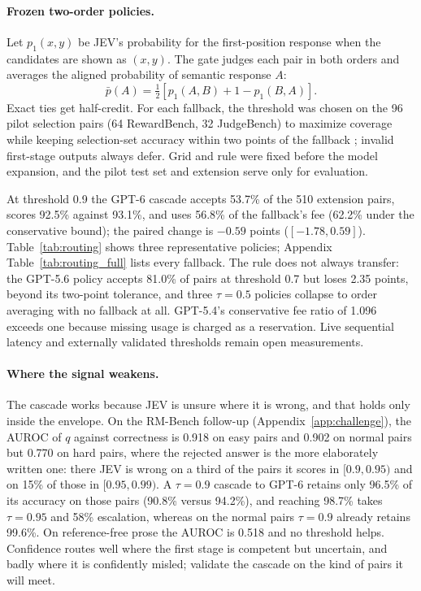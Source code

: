 \documentclass[11pt]{article}
\begin{document}
\paragraph{Frozen two-order policies.}
Let $p_1(x,y)$ be JEV's probability for the first-position response when the candidates are shown as $(x,y)$. The gate judges each pair in both orders and averages the aligned probability of semantic response $A$:
\begin{equation}
 \bar p(A)=\tfrac12\left[p_1(A,B)+1-p_1(B,A)\right].
\end{equation}
Exact ties get half-credit. For each fallback, the threshold was chosen on the 96 pilot selection pairs (64 RewardBench, 32 JudgeBench) to maximize coverage while keeping selection-set accuracy within two points of the fallback \citep{selective}; invalid first-stage outputs always defer. Grid and rule were fixed before the model expansion, and the pilot test set and extension serve only for evaluation.

At threshold 0.9 the GPT-6 cascade accepts 53.7\% of the 510 extension pairs, scores 92.5\% against 93.1\%, and uses 56.8\% of the fallback's fee (62.2\% under the conservative bound); the paired change is $-0.59$ points ($[-1.78,0.59]$). Table~\ref{tab:routing} shows three representative policies; Appendix Table~\ref{tab:routing_full} lists every fallback. The rule does not always transfer: the GPT-5.6 policy accepts 81.0\% of pairs at threshold 0.7 but loses 2.35 points, beyond its two-point tolerance, and three $\tau=0.5$ policies collapse to order averaging with no fallback at all. GPT-5.4's conservative fee ratio of 1.096 exceeds one because missing usage is charged as a reservation. Live sequential latency and externally validated thresholds remain open measurements.

\paragraph{Where the signal weakens.}
The cascade works because JEV is unsure where it is wrong, and that holds only inside the envelope. On the RM-Bench follow-up (Appendix~\ref{app:challenge}), the AUROC of $q$ against correctness is 0.918 on easy pairs and 0.902 on normal pairs but 0.770 on hard pairs, where the rejected answer is the more elaborately written one: there JEV is wrong on a third of the pairs it scores in $[0.9,0.95)$ and on 15\% of those in $[0.95,0.99)$. A $\tau=0.9$ cascade to GPT-6 retains only 96.5\% of its accuracy on those pairs (90.8\% versus 94.2\%), and reaching 98.7\% takes $\tau=0.95$ and 58\% escalation, whereas on the normal pairs $\tau=0.9$ already retains 99.6\%. On reference-free prose the AUROC is 0.518 and no threshold helps. Confidence routes well where the first stage is competent but uncertain, and badly where it is confidently misled; validate the cascade on the kind of pairs it will meet.
\end{document}
